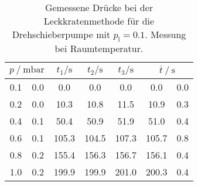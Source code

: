 \begin{table} 
\centering 
\caption{Gemessene Drücke bei der Leckkratenmethode für die Drehschieberpumpe mit $p_{\mathrm{l}}=0.1$. Messung bei Raumtemperatur.} 
\label{tab: leck_dreh_leck_0.1.pdf} 
\begin{tabular}{S[table-format=1.1]@{${}\pm{}$} S[table-format=1.1] S S S S[table-format=1.1]@{${}\pm{}$} S[table-format=1.1] } 
\toprule  
{} & {$t_1 / \si{ \second}$} & {$t_2 / \si{ \second}$} & {$t_3 / \si{ \second}$} &  \\ 
 & 0.0 & 0.0 & 0.0 & 0.0 & 0.0 & 0.0\\ 
0.2 & 0.0 & 10.3 & 10.8 & 11.5 & 10.9 & 0.3\\ 
0.4 & 0.1 & 50.4 & 50.9 & 51.9 & 51.0 & 0.4\\ 
0.6 & 0.1 & 105.3 & 104.5 & 107.3 & 105.7 & 0.8\\ 
0.8 & 0.2 & 155.4 & 156.3 & 156.7 & 156.1 & 0.4\\ 
1.0 & 0.2 & 199.9 & 199.9 & 201.0 & 200.3 & 0.4\\ 
\bottomrule 
\end{tabular} 
\end{table}